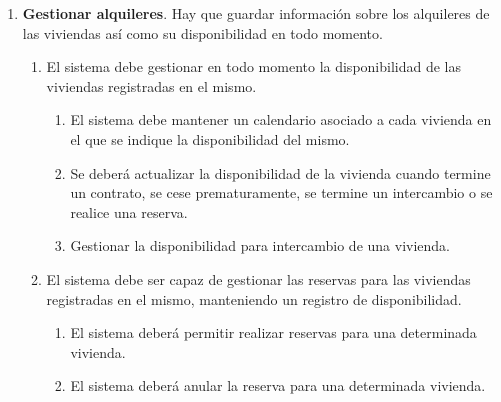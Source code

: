\documentclass[10pt,a4paper]{article}
\begin{document}
{\begin{enumerate}[\bfseries RF-1]
\begin{enumerate}[\bfseries RF-{2}.1]
\begin{enumerate}[\bfseries RF-{2}.{1}.1]
\item El sistema debe generar folletos conforme a las características del inmueble que se vaya a anunciar.
\item El sistema se debe encargar de añadir las viviendas registradas en todo el catálogo de portales inmobiliarios del que disponga.
\item El sistema se debe encargar de recomendar a los usuarios inmuebles afines a sus consultas anteriores.
\end{enumerate}
\item El sistema debe recoger información de los usuarios a partir de sus consultas anteriores.
\begin{enumerate}[\bfseries RF-{2}.{2}.1]
\item El sistema debe crear un perfil de los intereses de los usuarios conforme a la información recogida del mismo.
\end{enumerate}
\end{enumerate}
\item \textbf{Gestionar alquileres}. Hay que guardar información sobre los alquileres de las viviendas así como su disponibilidad en todo momento.
\begin{enumerate}[\bfseries RF-{3}.1]
\item El sistema debe gestionar en todo momento la disponibilidad de las viviendas registradas en el mismo.
\begin{enumerate}[\bfseries RF-{3}.{1}.1]
\item El sistema debe mantener un calendario asociado a cada vivienda en el que se indique la disponibilidad del mismo.
\item Se deberá actualizar la disponibilidad de la vivienda cuando termine un contrato, se cese prematuramente, se termine un intercambio o se realice una reserva.
\item Gestionar la disponibilidad para intercambio de una vivienda.
\end{enumerate}
\item El sistema debe ser capaz de gestionar las reservas para las viviendas registradas en el mismo, manteniendo un registro de disponibilidad.
\begin{enumerate}[\bfseries RF-{3}.{2}.1]
\item El sistema deberá permitir realizar reservas para una determinada vivienda.
\item El sistema deberá anular la reserva para una determinada vivienda.
\end{enumerate}
\end{enumerate}

\end{enumerate}}
\end{document}
